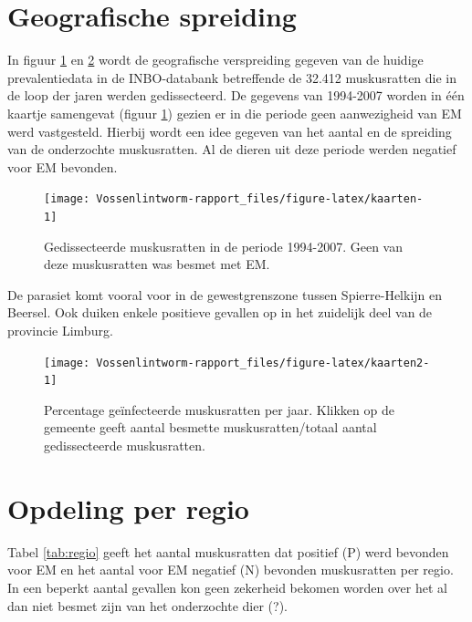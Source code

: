 \documentclass[twoside]{extreport}
\begin{document}
\section{Geografische spreiding}\label{geografische-spreiding}

In figuur \ref{fig:kaarten} en \ref{fig:kaarten2} wordt de geografische
verspreiding gegeven van de huidige prevalentiedata in de INBO-databank
betreffende de 32.412 muskusratten die in de loop der jaren werden
gedissecteerd. De gegevens van 1994-2007 worden in één kaartje
samengevat (figuur \ref{fig:kaarten}) gezien er in die periode geen
aanwezigheid van EM werd vastgesteld. Hierbij wordt een idee gegeven van
het aantal en de spreiding van de onderzochte muskusratten. Al de dieren
uit deze periode werden negatief voor EM bevonden.

\begin{figure}

{\centering \texttt{[image: Vossenlintworm-rapport\_files/figure-latex/kaarten-1]} 

}

\caption{Gedissecteerde muskusratten in de periode 1994-2007. Geen van deze muskusratten was besmet met EM.}\label{fig:kaarten}
\end{figure}

De parasiet komt vooral voor in de gewestgrenszone tussen
Spierre-Helkijn en Beersel. Ook duiken enkele positieve gevallen op in
het zuidelijk deel van de provincie Limburg.

\begin{figure}

{\centering \texttt{[image: Vossenlintworm-rapport\_files/figure-latex/kaarten2-1]} 

}

\caption{Percentage geïnfecteerde muskusratten per jaar. Klikken op de gemeente geeft aantal besmette muskusratten/totaal aantal gedissecteerde muskusratten.}\label{fig:kaarten2}
\end{figure}

\section{Opdeling per regio}\label{opdeling-per-regio}

Tabel \ref{tab:regio} geeft het aantal muskusratten dat positief (P)
werd bevonden voor EM en het aantal voor EM negatief (N) bevonden
muskusratten per regio. In een beperkt aantal gevallen kon geen
zekerheid bekomen worden over het al dan niet besmet zijn van het
onderzochte dier (?).
\end{document}

